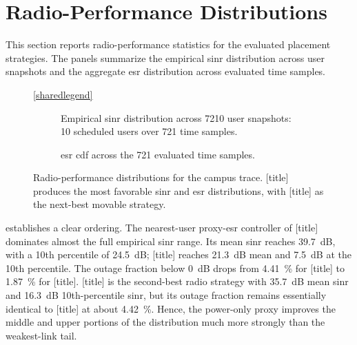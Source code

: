 \section{Radio-Performance Distributions}
\label{sec:results_sinr}

This section reports radio-performance statistics for the evaluated placement strategies. The panels summarize the empirical \gls{sinr} distribution across user snapshots and the aggregate \gls{esr} distribution across evaluated time samples.

\begin{figure}[t]
    \centering

    \ref{sharedlegend}
    \vspace*{1em}
    
    \begin{subfigure}[t]{0.48\textwidth}
        \centering
        \begingroup
        \def\postprocessfigurewidth{\linewidth}
        
        \endgroup
        \caption{Empirical \gls{sinr} distribution across \num{7210} user snapshots: \num{10} scheduled users over \num{721} time samples.}
        \label{fig:sinr_cdf}
    \end{subfigure}\hfill
    \begin{subfigure}[t]{0.48\textwidth}
        \centering
        \begingroup
        \def\postprocessfigurewidth{\linewidth}
        
        \endgroup
        \caption{\gls{esr} \gls{cdf} across the \num{721} evaluated time samples.}
        \label{fig:esr_cdf}
    \end{subfigure}
    \caption{Radio-performance distributions for the campus trace. [title] produces the most favorable \gls{sinr} and \gls{esr} distributions, with [title] as the next-best movable strategy.}
    \label{fig:radio_primary_pair}
\end{figure}

 establishes a clear ordering. The nearest-user proxy-\gls{esr} controller of [title] dominates almost the full empirical \gls{sinr} range. Its mean \gls{sinr} reaches \SI{39.7}{dB}, with a \num{10}th percentile of \SI{24.5}{dB}; [title] reaches \SI{21.3}{dB} mean and \SI{7.5}{dB} at the \num{10}th percentile. The outage fraction below \SI{0}{dB} drops from \SI{4.41}{\percent} for [title] to \SI{1.87}{\percent} for [title]. [title] is the second-best radio strategy with \SI{35.7}{dB} mean \gls{sinr} and \SI{16.3}{dB} \num{10}th-percentile \gls{sinr}, but its outage fraction remains essentially identical to [title] at about \SI{4.42}{\percent}. Hence, the power-only proxy improves the middle and upper portions of the distribution much more strongly than the weakest-link tail.

